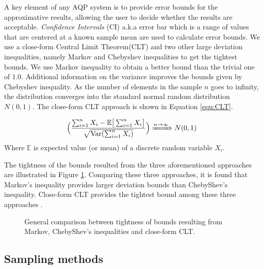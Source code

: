 A key element of any AQP system is to provide error bounds for the approximative results,    allowing the user to decide whether the results are acceptable. \emph{Confidence Intervals} (CI) a.k.a error bar which is a range of values that are centered at a known sample mean are used to calculate error bounds. We use a close-form Central Limit Theorem(CLT) and two other large deviation inequalities, namely Markov and Chebyshev inequalities to get the tightest bounds. We use Markov inequality to obtain a better bound than the trivial one of $1.0$.  Additional information on the variance improves the bounds given by Chebyshev inequality. As the number of elements in the sample $n$ goes to infinity, the distribution converges into the standard normal random distribution $N(0,1)$. The close-form CLT approach is shown in Equation \ref{equ:CLT}. 

\begin{equation} 
\label{equ:CLT}
\begin{aligned}
\Big(\frac{\sum_{i=1}^n X_i - \mathbb{E}\big[\sum_{i=1}^n X_i\big]}{\sqrt{\mathrm{Var}(\sum_{i=1}^n X_i)}}\Big)\xRightarrow[\text{}]{n\to\infty } N(0,1)
\end{aligned}
\end{equation}
Where $\mathbb{E}$ is expected value (or mean) of a discrete random variable $X_i$.  

The tightness of the bounds resulted from the three aforementioned approaches are illustrated in Figure \ref{fig:inequalites}. Comparing these three approaches, it is found that Markov's inequality provides larger deviation bounds than ChebyShev's inequality. Close-form CLT provides the tightest bound among these three approaches \cite{huber1967behavior}.

\begin{figure}[H]
\centering
\resizebox{0.6\textwidth}{!}{}
\caption{General comparison between tightness of bounds resulting from Markov, ChebyShev's inequalities and close-form CLT.}
\label{fig:inequalites}
\end{figure}


\subsection{Sampling methods}
\label{SamplingMethodsSubsection}


